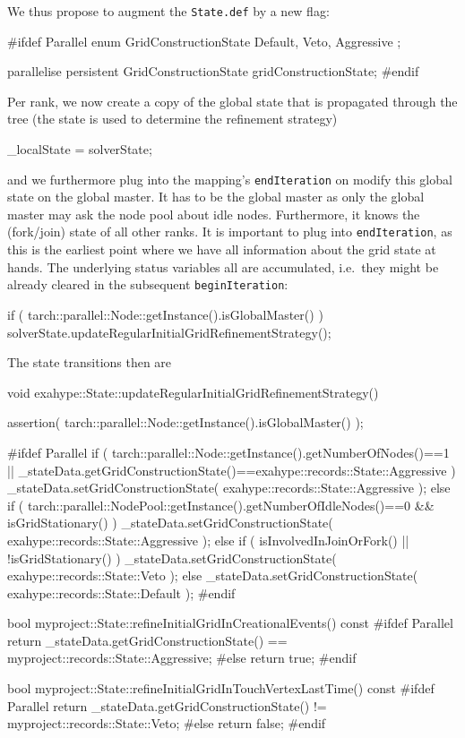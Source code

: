 We thus propose to augment the \texttt{State.def} by a new flag:
\begin{code}
  #ifdef Parallel
  enum GridConstructionState {
    Default, Veto, Aggressive
  };
  
  parallelise persistent GridConstructionState  gridConstructionState; 
  #endif
\end{code}

\noindent
Per rank, we now create a copy of the global state that is propagated through
the tree (the state is used to determine the refinement strategy)
\begin{code}
  _localState = solverState;
\end{code}

\noindent
and we furthermore plug into the mapping's \texttt{endIteration} on modify this
global state on the global master. 
It has to be the global master as only the global master may ask the node pool
about idle nodes. 
Furthermore, it knows the (fork/join) state of all other ranks.
It is important to plug into \texttt{endIteration}, as this is the earliest
point where we have all information about the grid state at hands. 
The underlying status variables all are accumulated, i.e.~they might be already
cleared in the subsequent \texttt{beginIteration}:
\begin{code}
  if ( tarch::parallel::Node::getInstance().isGlobalMaster() ) {
    solverState.updateRegularInitialGridRefinementStrategy();
  }
\end{code}

\noindent
The state transitions then are
\begin{code}
void exahype::State::updateRegularInitialGridRefinementStrategy() {
  assertion( tarch::parallel::Node::getInstance().isGlobalMaster() );

  #ifdef Parallel
  if (
    tarch::parallel::Node::getInstance().getNumberOfNodes()==1
    ||
    _stateData.getGridConstructionState()==exahype::records::State::Aggressive
  ) {
    _stateData.setGridConstructionState( exahype::records::State::Aggressive );
  }
  else if (
    tarch::parallel::NodePool::getInstance().getNumberOfIdleNodes()==0
    &&
    isGridStationary()
  ) {
    _stateData.setGridConstructionState( exahype::records::State::Aggressive );
  }
  else if (
    isInvolvedInJoinOrFork()
    ||
    !isGridStationary()
  ) {
    _stateData.setGridConstructionState( exahype::records::State::Veto );
  }
  else {
    _stateData.setGridConstructionState( exahype::records::State::Default );
  }
  #endif
}

bool myproject::State::refineInitialGridInCreationalEvents() const {
  #ifdef Parallel
  return _stateData.getGridConstructionState() == myproject::records::State::Aggressive;
  #else
  return true;
  #endif
}

bool myproject::State::refineInitialGridInTouchVertexLastTime() const {
  #ifdef Parallel
  return _stateData.getGridConstructionState() != myproject::records::State::Veto;
  #else
  return false;
  #endif
}
\end{code}

